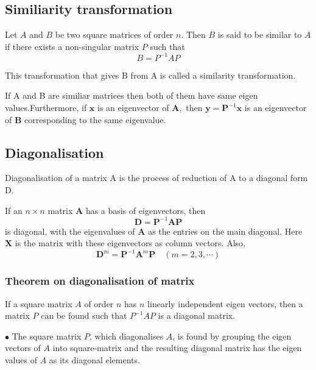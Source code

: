 \begin{answer}
\end{answer}

\subsection{Similiarity transformation}
Let $A$ and $B$ be two square matrices of order $n$. Then $B$ is said to be similar to $A$ if there exists a non-singular matrix $P$ such that
\begin{equation}
B=P^{-1} A P
\end{equation}

This transformation that gives B from A is called a similarity transformation.
\begin{note}
	If A and B are similiar matrices then both of them have same eigen values.Furthermore, if $\mathbf{x}$ is an eigenvector of $\mathbf{A},$ then $\mathbf{y}=\mathbf{P}^{-1} \mathbf{x}$ is an eigenvector of $\mathbf{B}$ corresponding to the same eigenvalue.\end{note}
\subsection{Diagonalisation}
Diagonalisation of a matrix A is the process of reduction of A to a diagonal form D.

If an $n \times n$ matrix $\mathbf{A}$ has a basis of eigenvectors, then
\begin{equation}
\mathbf{D}=\mathbf{P}^{-1} \mathbf{A} \mathbf{P}
\end{equation}
is diagonal, with the eigenvalues of $\mathbf{A}$ as the entries on the main diagonal. Here $\mathbf{X}$ is the matrix with these eigenvectors as column vectors. Also,
\begin{equation}
\mathbf{D}^{m}=\mathbf{P}^{-1} \mathbf{A}^{m} \mathbf{P} \quad(m=2,3, \cdots)
\end{equation}
\subsubsection{Theorem on diagonalisation of matrix}
\begin{theorem}
	If a square matrix $A$ of order $n$ has $n$ linearly independent eigen vectors, then a matrix $P$ can be found such that $P^{-1} A P$ is a diagonal matrix.
\end{theorem}

	$\bullet$ The square matrix $P$, which diagonalises $A$, is found by grouping the eigen vectors of $A$ into square-matrix and the resulting diagonal matrix has the eigen values of $A$ as its diagonal elements.
	 
